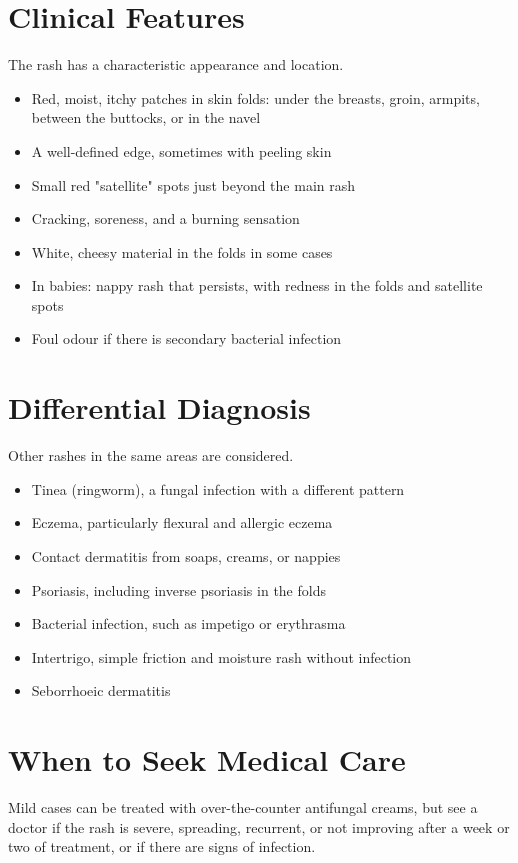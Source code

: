\section*{Clinical Features}
The rash has a characteristic appearance and location.

\begin{itemize}
    \item Red, moist, itchy patches in skin folds: under the breasts, groin, armpits, between the buttocks, or in the navel
    \item A well-defined edge, sometimes with peeling skin
    \item Small red "satellite" spots just beyond the main rash
    \item Cracking, soreness, and a burning sensation
    \item White, cheesy material in the folds in some cases
    \item In babies: nappy rash that persists, with redness in the folds and satellite spots
    \item Foul odour if there is secondary bacterial infection
\end{itemize}

\section*{Differential Diagnosis}
Other rashes in the same areas are considered.

\begin{itemize}
    \item Tinea (ringworm), a fungal infection with a different pattern
    \item Eczema, particularly flexural and allergic eczema
    \item Contact dermatitis from soaps, creams, or nappies
    \item Psoriasis, including inverse psoriasis in the folds
    \item Bacterial infection, such as impetigo or erythrasma
    \item Intertrigo, simple friction and moisture rash without infection
    \item Seborrhoeic dermatitis
\end{itemize}

\section*{When to Seek Medical Care}
Mild cases can be treated with over-the-counter antifungal creams, but see a doctor if the rash is severe, spreading, recurrent, or not improving after a week or two of treatment, or if there are signs of infection.

